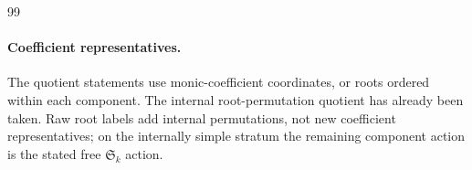 \documentclass[11pt,reqno]{amsart}
\numberwithin{equation}{section}
\theoremstyle{definition}\newtheorem{definition}[theorem]{Definition}
\theoremstyle{remark}\newtheorem{remark}[theorem]{Remark}
\begin{document}





\ifdefined\AIIcoreonly
\begin{thebibliography}{99}

\end{thebibliography}
\else
\appendix










\paragraph{Coefficient representatives.}
The quotient statements use monic-coefficient coordinates, or roots
ordered within each component. The internal root-permutation quotient
has already been taken. Raw root labels add internal permutations,
not new coefficient representatives; on the internally simple
stratum the remaining component action is the stated free
$\mathfrak S_k$ action.















\let\AIIoldbibliography\thebibliography
\let\AIIoldendbibliography\endthebibliography
\renewenvironment{thebibliography}[1]
 {\AIIoldbibliography{#1}}
 {\AIIoldendbibliography}

\fi
\end{document}

